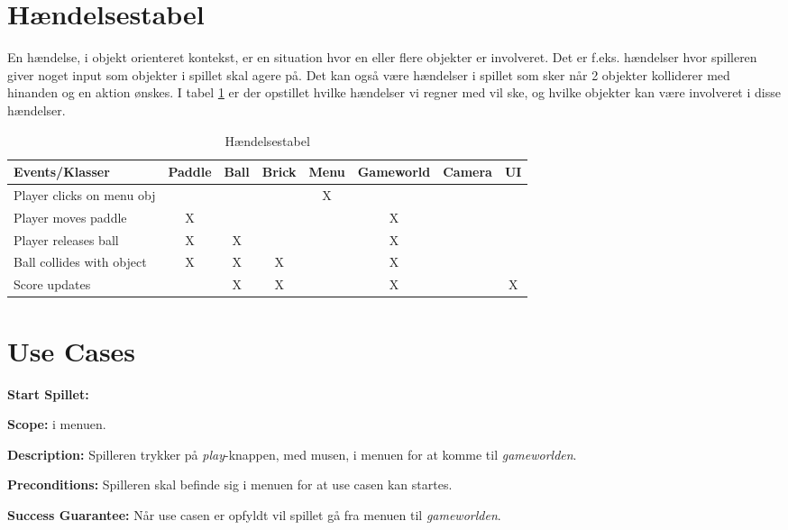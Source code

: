 \section{Hændelsestabel}
En hændelse, i objekt orienteret kontekst, er en situation hvor en eller flere objekter er involveret. Det er f.eks. hændelser hvor spilleren giver noget input som objekter i spillet skal agere på. Det kan også være hændelser i spillet som sker når 2 objekter kolliderer med hinanden og en aktion ønskes. I tabel \ref{eventtabel} er der opstillet hvilke hændelser vi regner med vil ske, og hvilke objekter kan være involveret i disse hændelser.
\begin{table}[]
\centering
\caption{Hændelsestabel}
\label{eventtabel}
\begin{tabular}{|l|c|c|c|c|c|c|c|}
\hline
Events/Klasser & Paddle & Ball & Brick & Menu & Gameworld & Camera & UI \\ \hline
Player clicks on menu obj &  &  &  & X &  &  &  \\ \hline
Player moves paddle & X &  &  &  & X &  &  \\ \hline
Player releases ball & X & X &  &  & X &  &  \\ \hline
Ball collides with object & X & X & X &  & X &  &  \\ \hline
Score updates &  & X & X &  & X &  & X \\ \hline
\end{tabular}
\end{table}

\section{Use Cases}

\textbf{Start Spillet:}\newline

\textbf{Scope:}\newline
i menuen.\newline

\textbf{Description:} \newline
Spilleren trykker på \textit{play}-knappen, med musen, i menuen for at komme til \textit{gameworlden}. \newline

\textbf{Preconditions:}\newline
Spilleren skal befinde sig i menuen for at use casen kan startes.\newline

\textbf{Success Guarantee:}\newline
Når use casen er opfyldt vil spillet gå fra menuen til \textit{gameworlden}.\newline

